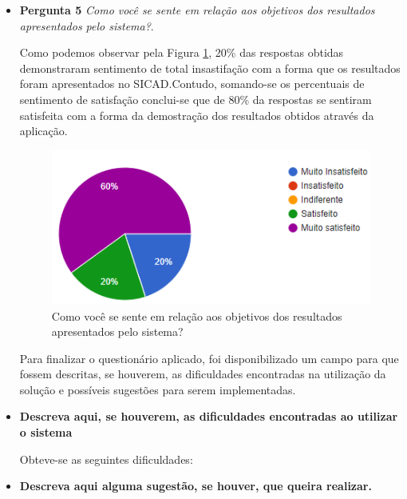 \documentclass[12pt, a4paper]{report}
\begin{document}
\begin{itemize}
\item{\textbf{ Pergunta 5}}
\textit{Como você se sente em relação aos objetivos dos resultados apresentados pelo sistema?}.


Como podemos observar pela Figura \ref{fig:grafico_resultados}, 20\% das respostas obtidas demonstraram  sentimento de total insastifação com a forma que os resultados foram apresentados no \ac{SICAD}.Contudo, somando-se os percentuais de  sentimento de satisfação conclui-se que de 80\% da respostas se sentiram satisfeita com a forma da demostração dos resultados obtidos através da aplicação.

\begin{figure}
\centering
\includegraphics[scale=0.8]{grafico_resultados.png}
\caption{Como você se sente em relação aos objetivos dos resultados apresentados pelo sistema?}
\label{fig:grafico_resultados}
\end{figure}

Para finalizar o questionário aplicado, foi disponibilizado um campo para que fossem descritas, se houverem, as dificuldades encontradas na utilização da solução e possíveis sugestões para serem implementadas.

\item{\textbf{ Descreva aqui, se houverem, as dificuldades encontradas ao utilizar o sistema}}

Obteve-se as seguintes dificuldades:

\item{\textbf{ Descreva aqui alguma sugestão, se houver, que queira realizar.}}



\end{itemize}
\end{document}
